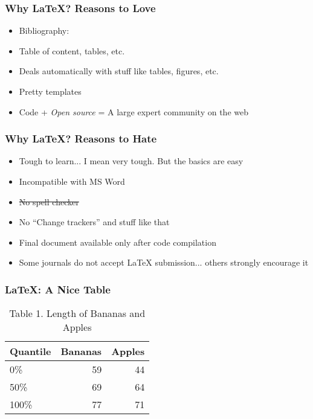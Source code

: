 \documentclass{beamer}
\begin{document}
    \begin{frame}
        \frametitle{Why \LaTeX? Reasons to Love} \vspace{1cm}
        \begin{itemize}
           \item{Bibliography: \BibTeX}
           \item{Table of content, tables, etc.}
           \item{Deals automatically with stuff like tables, figures, etc.}
           \item{Pretty templates}
           \item{Code + \emph{Open source} = A large expert community on the web}
        \end{itemize} 
    \end{frame}
    
    \begin{frame}
        \frametitle{Why \LaTeX? Reasons to Hate} \vspace{1cm}
        \begin{itemize}
           \item{Tough to learn... I mean very tough. But the basics are easy}
           \item{Incompatible with MS Word}
           \item{\sout{No spell checker}}
           \item{No ``Change trackers'' and stuff like that}
           \item{Final document available only after code compilation}
           \item{Some journals do not accept \LaTeX{} submission... others strongly encourage it}
        \end{itemize} 
    \end{frame}

    \begin{frame}
        \frametitle{\LaTeX: A Nice Table} \vspace{1cm}   
            \begin{table}
              \centering
              \normalsize
              \caption{\large{Table 1. Length of Bananas and Apples}}
              \begin{tabular}{lrr}
                  Quantile & Bananas & Apples\\\hline 
                  0\% & 59 & 44\\
                  50\% &69&64\\
                  100\% & 77 & 71\\
              \end{tabular}
              \label{tab:bananespommes}
            \end{table}  
    \end{frame}
    
\end{document}
